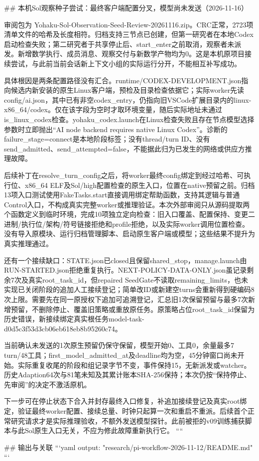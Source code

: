 ## 本机Sol观察种子尝试：最终客户端配置分叉，模型尚未发送（2026-11-16）

审阅包为 Yohaku-Sol-Observation-Seed-Review-20261116.zip。CRC正常，2723项清单文件的哈希及长度相符。归档支持三节点已创建，但第一研究者在本地Codex启动检查失败；第二研究者于共享停止后、start_enter之前取消，观察者未派发。新增数学执行、成员消息、观察交付与新数学产物均为0。这是本机原项目接续尝试，与此前当前会话新上下文小组的实际运行分开，不能相互补写成功。

具体根因是两条配置路径没有汇合。runtime/CODEX-DEVELOPMENT.json指向候选内新安装的原生Linux客户端，预检及目录检查依据它；实际worker先读config/ai.json，其中已有非空codex_entry，仍指向旧VSCode扩展目录内的linux-x86_64/codex。仅在该字段为空时才取环境变量，随后实际地址未通过is_linux_codex检查。yohaku_codex.launch在Linux检查失败且存在节点模型选择参数时立即抛出“AI node backend requires native Linux Codex”。诊断的failure_stage=connect是本地阶段标签；没有thread/turn ID、没有send_admitted、send_attempted=false，不能据此归为已发生的网络或供应方推理故障。

后续补丁在resolve_turn_config之后，将worker最终config绑定到经过哈希、可执行位、x86_64 ELF及Sol/high配置检查的原生入口，位置在native预留之前。归档13项入口测试使用FakeTasks.start直接调用绑定帮助函数，支持其逻辑与普通Control入口，不构成真实完整worker或推理验证。本次外部审阅只从源码提取两个函数定义到临时环境，完成10项独立定向检查：旧入口覆盖、配置保持、变更二进制/执行位/架构/符号链接拒绝和profile拒绝，以及实际worker调用位置检查。没有导入原模块、运行归档管理脚本、启动原生客户端或模型；这些结果不提升为真实推理通过。

还有一个接续缺口：STATE.json已closed且保留shared_stop，manage.launch由RUN-STARTED.json拒绝重复执行。NEXT-POLICY-DATA-ONLY.json虽记录剩余7次及真实root_task_id，但repaired SeedGate不读取remaining_limits，也未实现已关闭阶段的追加人工接续登记；简单改ID或新建空turns会重新得到硬编码8次上限。需要先在同一原授权下追加可追溯登记，汇总旧1次保留预留与最多7次新增预留，不删除停止、覆盖旧策略或重放原任务。原策略占位root_task_id保留为历史错误，新接续绑定真实根任务model-task-d0d5c3f53d3cb06eb618eb8b95260c74。

当前确认未发送的1次原生预留仍保守保留，模型开始0、工具0，余量最多7 turn/48工具；first_model_admitted_at及deadline均为空，45分钟窗口尚未开始。实际重复收尾的阶段和组记录字节不变，事件保持15，无新派发或watcher。历史Adaption64次与81笔未知及其累计账本SHA-256保持；本次仍按“保持停止、先审阅”的决定不激活原机。

下一步可在停止状态下合入并封存最终入口修复，补追加接续登记及真实root绑定，验证最终worker配置、接续总量、时钟只起算一次和重启不重派。后续首个正常研究请求才是实际推理验收，不额外发送模型探针。此前被拒的v09训练捕获脚本与此Sol原生入口无关，不应为修此故障重新执行它。
````

## 输出与关联
```yaml
output: "research/pi-workflow-2026-11-12/README.md"
```

